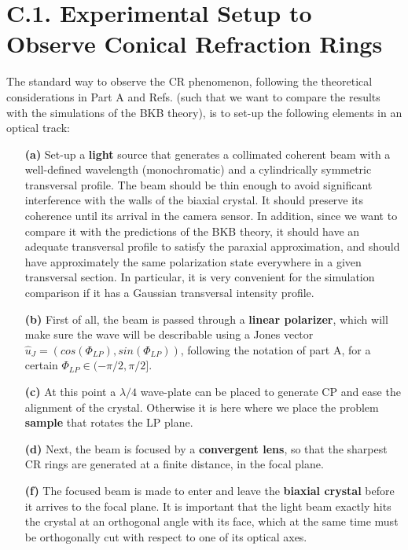 \documentclass[11pt, a4paper, twoside]{article} %
\begin{document}
\section*{C.1. Experimental Setup to Observe Conical Refraction Rings}\vspace{-0.2cm}
The standard way to observe the CR phenomenon, following the theoretical considerations in Part A and Refs. \cite{Todor, Turpin} (such that we want to compare the results with the simulations of the BKB theory), is to set-up the following elements in an optical track:\vspace{-0.2cm} 
\begin{itemize}
\item[\bf (a)] Set-up a {\bf light} source that generates a collimated coherent beam with a well-defined wavelength (monochromatic) and a cylindrically symmetric transversal profile. The beam should be thin enough to avoid significant interference with the walls of the biaxial crystal. It should preserve its coherence until its arrival in the camera sensor. In addition, since we want to compare it with the predictions of the BKB theory, it should have an adequate transversal profile to satisfy the paraxial approximation, and should have approximately the same polarization state everywhere in a given transversal section. In particular, it is very convenient for the simulation comparison if it has a Gaussian transversal intensity profile.

\item[\bf (b)] First of all, the beam is passed through a {\bf linear polarizer}, which will make sure the wave will be describable using a Jones vector $\hat{u}_J=(cos(\Phi_{LP}), sin(\Phi_{LP}))$, following the notation of part A, for a certain $\Phi_{LP}\in(-\pi/2, \pi/2]$.

\item[\bf (c)] At this point a $\lambda/4$ wave-plate can be placed to generate CP and ease the alignment of the crystal. Otherwise it is here where we place the problem {\bf sample} that rotates the LP plane. 

\item[\bf (d)] Next, the beam is focused by a {\bf convergent lens}, so that the sharpest CR rings are generated at a finite distance, in the focal plane.

\item[\bf (f)] The focused beam is made to enter and leave the {\bf biaxial crystal} before it arrives to the focal plane. It is important that the light beam exactly hits the crystal at an orthogonal angle with its face, which at the same time must be orthogonally cut with respect to one of its optical axes. 


\end{itemize}
\end{document}

